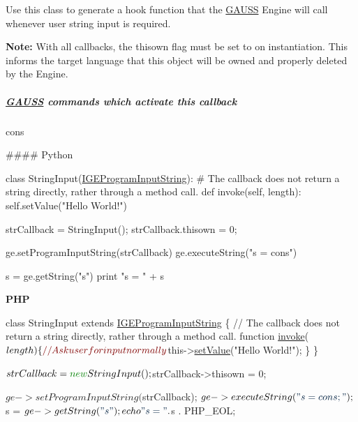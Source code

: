 Use this class to generate a hook function that the \hyperlink{class_g_a_u_s_s}{G\+A\+U\+SS} Engine will call whenever user string input is required.

{\bfseries Note\+:} With all callbacks, the {\ttfamily thisown} flag must be set to {} on instantiation. This informs the target language that this object will be owned and properly deleted by the Engine.

\subparagraph*{\hyperlink{class_g_a_u_s_s}{G\+A\+U\+SS} commands which activate this callback}


\begin{DoxyItemize}
\item {\ttfamily cons}

\#\#\#\# Python 
\begin{DoxyCode}
\textcolor{keyword}{class }StringInput(\hyperlink{class_i_g_e_program_input_string}{IGEProgramInputString}):
    \textcolor{comment}{# The callback does not return a string directly, rather through a method call.}
    \textcolor{keyword}{def }invoke(self, length):
        self.setValue(\textcolor{stringliteral}{"Hello World!"})

strCallback = StringInput();
strCallback.thisown = 0;

ge.setProgramInputString(strCallback)
ge.executeString(\textcolor{stringliteral}{"s = cons"})

s = ge.getString(\textcolor{stringliteral}{"s"})
\textcolor{keywordflow}{print} \textcolor{stringliteral}{"s = "} + s
\end{DoxyCode}

\end{DoxyItemize}

{\bfseries P\+HP} 
\begin{DoxyCode}
\textcolor{keyword}{class }StringInput \textcolor{keyword}{extends} \hyperlink{class_i_g_e_program_input_string}{IGEProgramInputString} \{
    \textcolor{comment}{// The callback does not return a string directly, rather through a method call.}
    \textcolor{keyword}{function} \hyperlink{class_i_g_e_program_input_string_aff170652d98f6a992a27134a7c674e01}{invoke}($length) \{
        \textcolor{comment}{// Ask user for input normally}
        $this->\hyperlink{class_i_g_e_program_input_string_ac692d94b650c29fe8d82690c78003be6}{setValue}(\textcolor{stringliteral}{"Hello World!"});
    \}
\}

$strCallback = \textcolor{keyword}{new} StringInput();
$strCallback->thisown = 0;

$ge->setProgramInputString($strCallback);
$ge->executeString(\textcolor{stringliteral}{"s = cons;"});

$s = $ge->getString(\textcolor{stringliteral}{"s"});
echo \textcolor{stringliteral}{"s = "} . $s . PHP\_EOL;
\end{DoxyCode}


